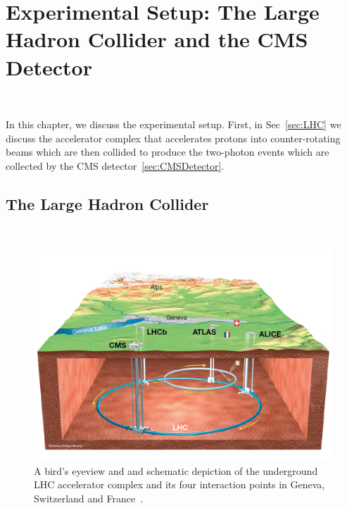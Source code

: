 \chapter{Experimental Setup: The Large Hadron Collider and the CMS Detector}~\label{ch:CMSExperiment}

{\small {}
\vspace{-2ex}
}
\vspace{4ex}

In this chapter, we discuss the experimental setup. First, in Sec~\ref{sec:LHC} we discuss the accelerator complex that accelerates protons into counter-rotating beams which are then collided to produce the two-photon events which are collected by the CMS detector~\ref{sec:CMSDetector}. 

\section{The Large Hadron Collider}~\label{sec:LHC}
\begin{figure}[!htb]
	\centering
	\includegraphics[scale=0.3]{fig/lhc_overview.png}
	\caption{A bird's eyeview and and schematic depiction of the underground LHC accelerator complex and its four interaction points in Geneva, Switzerland and France~\cite{Mouche:1708847}.}
	\label{lhc-overview}
\end{figure}


\justifying \parindent=25pt


